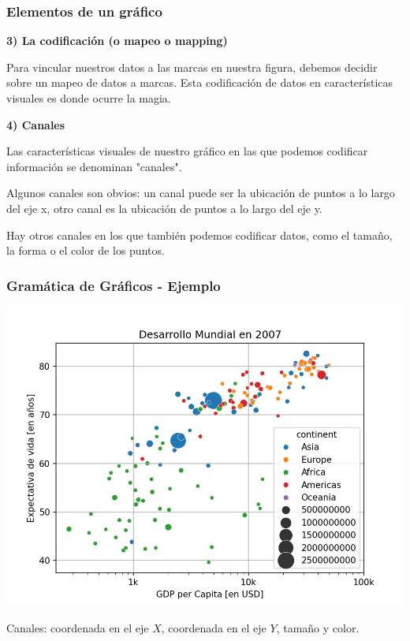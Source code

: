 \documentclass[aspectratio=169,12pt]{beamer}
\begin{document}

\begin{frame}
\frametitle{Elementos de un gráfico}

\textbf{3) La codificación (o mapeo o mapping)}

Para vincular nuestros datos a las marcas en nuestra figura, debemos decidir sobre un mapeo de datos a marcas. Esta codificación de datos en características visuales es donde ocurre la magia.

\textbf{4) Canales}

Las características visuales de nuestro gráfico en las que podemos codificar información se denominan "canales". 

Algunos canales son obvios: un canal puede ser la ubicación de puntos a lo largo del eje x, otro canal es la ubicación de puntos a lo largo del eje y.

Hay otros canales en los que también podemos codificar datos, como el tamaño, la forma o el color de los puntos.

\end{frame}


\begin{frame}
\frametitle{Gramática de Gráficos - Ejemplo}

\begin{center}
\includegraphics[scale=0.5]{desarrollo2007.png}
\end{center}

Canales: coordenada en el eje $X$, coordenada en el eje $Y$, tamaño y color.
\end{frame}
\end{document}

